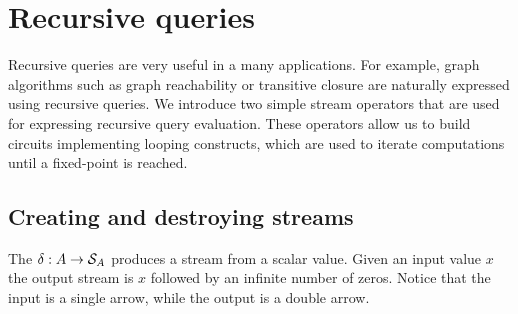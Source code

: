 \section{Recursive queries}\label{sec:recursion}

Recursive queries are very useful in a many applications.  For
example, graph algorithms such as graph reachability or transitive
closure are naturally expressed using recursive queries.  We introduce
two simple \dbsp stream operators that are used for expressing
recursive query evaluation.  These operators allow us to build
circuits implementing looping constructs, which are used to iterate
computations until a fixed-point is reached.

\subsection{Creating and destroying streams}



The  $\delta : A \rightarrow \mathcal{S}_{A}$
produces a stream from a scalar value.  Given an input value $x$ the
output stream is $x$ followed by an infinite number of zeros.  Notice
that the input is a single arrow, while the output is a double arrow.

\begin{center}
\end{center}

